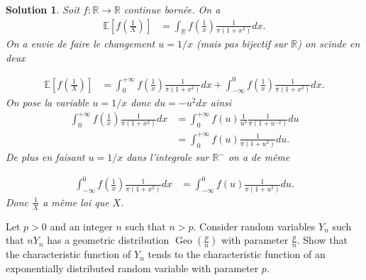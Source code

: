 \documentclass{article}
\newtheorem{solution}{Solution}
\begin{document}
\begin{solution}
  Soit $f:\mathbb R\longrightarrow \mathbb R$ continue born\'ee. On a
  \begin{align*}
    \mathbb E[f\left(\frac{1}{X}\right)] & =\int_\mathbb R f\left(\frac1x\right) \frac{1}{\pi(1+x^2)} dx.
  \end{align*}
  On a envie de faire le changement $u=1/x$ (mais pas bijectif sur $\mathbb R$) on scinde en deux

  \begin{align*}
    \mathbb E[f(\frac1X)] & =\int_0^{+\infty} f(\frac1x) \frac{1}{\pi(1+x^2)} dx+ \int_{-\infty}^0 f(\frac1x) \frac{1}{\pi(1+x^2)} dx.
  \end{align*}
  On pose la variable $u=1/x$ donc $du=-u^2 dx$ ainsi
  \begin{align*}
    \int_0^{+\infty} f(\frac1x) \frac{1}{\pi(1+x^2)} dx & =\int_0^{+\infty} f(u)\frac{1}{u^2}  \frac{1}{\pi(1+u^{-2})} du \\
                                                        & =\int_0^{+\infty} f(u) \frac{1}{\pi(1+u^2)} du.
  \end{align*}
  De plus en faisant $u=1/x$ dans l'integrale sur $\mathbb R^-$ on a de m\^eme

  \begin{align*}
    \int_{-\infty}^0 f(\frac1x) \frac{1}{\pi(1+x^2)} dx & =\int_{-\infty}^0 f(u) \frac{1}{\pi(1+u^2)} du.
  \end{align*}
  Donc $\frac1X$ a m\^eme loi que $X$.
\end{solution}

\begin{Exercise}
  Let $p>0$ and an integer $n$ such that $n>p$. Consider random variables $Y_{n}$ such that $n Y_{n}$ has a geometric distribution $\operatorname{Geo}\left(\frac{p}{n}\right)$ with parameter $\frac{p}{n}$. Show that the characteristic function of $Y_{n}$ tends to the characteristic function of an exponentially distributed random variable with parameter $p$.
\end{Exercise}
\end{document}
